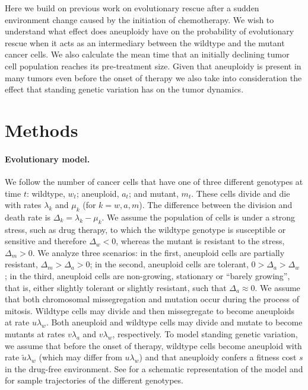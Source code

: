 \documentclass[12pt]{extarticle}
\begin{document}
Here we build on previous work on evolutionary rescue after a sudden environment change caused by the initiation of chemotherapy. We wish to understand what effect does aneuploidy have on the probability of evolutionary rescue when it acts as an intermediary between the wildtype and the mutant cancer cells. We also calculate the mean time that an initially declining tumor cell population reaches its pre-treatment size. Given that aneuploidy is present in many tumors even before the onset of therapy \citep{lukow2021chromosomal} we also take into consideration the effect that standing genetic variation has on the tumor dynamics.

\section*{Methods}

\paragraph{Evolutionary model.}
We follow the number of cancer cells that have one of three different genotypes at time $t$: wildtype, $w_t$; aneuploid, $a_t$; and mutant, $m_t$. 
These cells divide and die with rates $\lambda_k$ and $\mu_k$ (for $k=w, a, m$).
The difference between the division and death rate is $\Delta_k = \lambda_k-\mu_k$.
We assume the population of cells is under a strong stress, such as drug therapy, to which the wildtype genotype is susceptible or sensitive and therefore $\Delta_w<0$, whereas the mutant is resistant to the stress, $\Delta_m>0$.
We analyze three scenarios: in the first, aneuploid cells are partially resistant, $\Delta_m>\Delta_a>0$; in the second, aneuploid cells are tolerant, $0>\Delta_a>\Delta_w$ \citep[see][for the distinction between susceptible, resistant, and tolerant]{brauner2016distinguishing}; in the third, aneuploid cells are non-growing, stationary or ``barely growing'', that is, either slightly tolerant or slightly resistant, such that $\Delta_a \approx 0$. 
We assume that both chromosomal missegregation and mutation occur during the process of mitosis. 
Wildtype cells may divide and then missegregate to become aneuploids at rate $u\lambda_w$. Both aneuploid and wildtype cells may divide and mutate to become mutants at rates $v\lambda_{a}$ and $v\lambda_{w}$, respectively.
To model standing genetic variation, we assume that before the onset of therapy, wildtype cells become aneuploid with rate $\tilde{u}\lambda_w$ (which may differ from $u \lambda_w$) and that aneuploidy confers a fitness cost $s$ in the drug-free environment. %
See  for a schematic representation of the model and  for sample trajectories of the different genotypes. 
\end{document}
